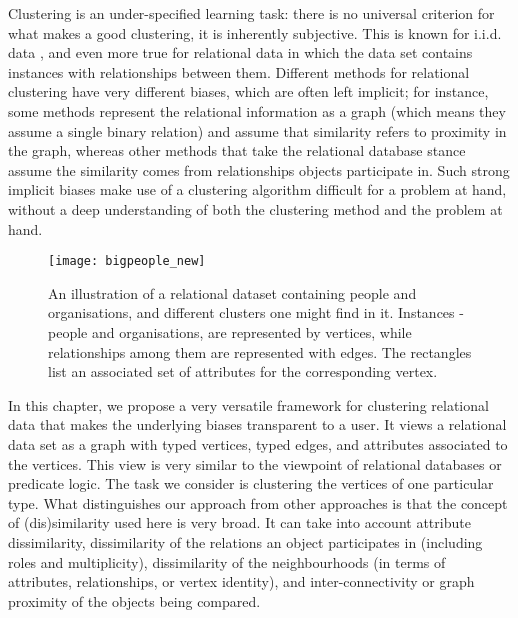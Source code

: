 Clustering is an under-specified learning task: there is no universal criterion for what makes a good clustering, it is inherently subjective.
This is known for i.i.d. data \cite{Estivill-Castro:2002}, and even more true for relational data in which the data set contains instances with relationships between them.
Different methods for relational clustering have very different biases, which are often left implicit; for instance, some methods represent the relational information as a graph (which means they assume a single binary relation) and assume that similarity refers to proximity in the graph, whereas other methods that take the relational database stance assume the similarity comes from relationships objects participate in.
Such strong implicit biases make use of a clustering algorithm difficult for a problem at hand, without a deep understanding of both the clustering method and the problem at hand.

\begin{figure}
  \centering
  \medskip
  \texttt{[image: bigpeople\_new]}
  \caption[Example relational dataset]{An illustration of a relational dataset containing people and organisations, and different clusters one might find in it. Instances - people and organisations, are represented by vertices, while relationships among them are represented with edges. The rectangles list an associated set of attributes for the corresponding vertex.}
  \label{fig:clustering:intro}
\end{figure}


In this chapter, we propose a very versatile framework for clustering relational data that makes the underlying biases transparent to a user.
It views a relational data set as a graph with typed vertices, typed edges, and attributes associated to the vertices.
This view is very similar to the viewpoint of relational databases or predicate logic.
The task we consider is clustering the vertices of one particular type.
What distinguishes our approach from other approaches is that the concept of (dis)similarity used here is very broad.
It can take into account attribute dissimilarity, dissimilarity of the relations an object participates in (including roles and multiplicity), dissimilarity of the neighbourhoods (in terms of attributes, relationships, or vertex identity), and inter-connectivity or graph proximity of the objects being compared.



